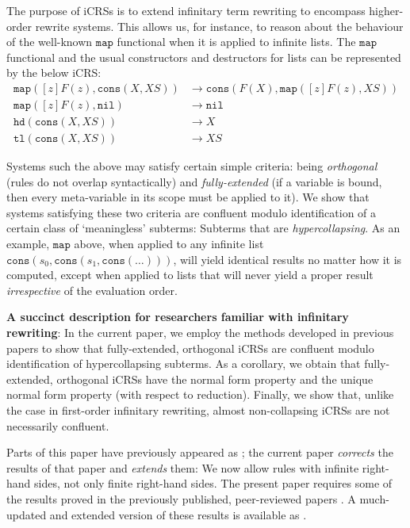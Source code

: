 \documentclass{LMCS}
\theoremstyle{plain}
\theoremstyle{definition}
\newcommand{\rew}{\rightarrow}
\begin{document}
The purpose of iCRSs is to extend infinitary term rewriting to encompass higher-order rewrite systems.
This allows us, for instance, to reason about the behaviour of the well-known $\mathtt{map}$ functional 
when it is applied to infinite lists. The $\mathtt{map}$ functional
and the usual constructors and destructors for lists can be represented by the below iCRS:
\begin{align*}
\mathtt{map}([z]F(z),\mathtt{cons}(X,XS)) & \rew
\mathtt{cons}(F(X),\mathtt{map}([z]F(z),XS)) \\
\mathtt{map}([z]F(z),\mathtt{nil}) & \rew \mathtt{nil}\\
\mathtt{hd}(\mathtt{cons}(X,XS)) & \rew X \\
\mathtt{tl}(\mathtt{cons}(X,XS)) & \rew XS
\end{align*}

Systems such the above may satisfy certain simple criteria: being \emph{orthogonal} (rules do not overlap syntactically) and \emph{fully-extended} (if a variable is bound, then every meta-variable in its scope must be applied to it). We show that systems satisfying these two criteria are confluent modulo identification of a certain class of `meaningless' subterms: Subterms that are \emph{hypercollapsing}. As an example, $\mathtt{map}$ above, when applied to any infinite list $\mathtt{cons}(s_0,\mathtt{cons}(s_1,\mathtt{cons}(\ldots)))$, will yield identical results no matter how it is computed, except when applied to lists that will never yield a proper result \emph{irrespective} of the evaluation order.

{\bf A succinct description for researchers familiar with infinitary rewriting}: In the current paper, we employ the methods developed in previous papers to show that fully-extended, orthogonal iCRSs are confluent modulo identification of hypercollapsing subterms. As a corollary, we obtain that fully-extended, orthogonal iCRSs have the normal form property and the unique normal form property (with respect to reduction). Finally, we show that, unlike the case in first-order infinitary rewriting, almost non-collapsing iCRSs are not necessarily confluent.  

Parts of this paper have previously appeared as \cite{JJ05b}; the current paper \emph{corrects} the results of that paper and \emph{extends} them: We now allow rules with infinite right-hand sides, not only finite right-hand sides.
The present paper requires some of the results proved in the previously published, peer-reviewed papers \cite{JJ05a,JJ05b}. A much-updated and extended version of these results is available as \cite{paper_i}. 
\end{document}
